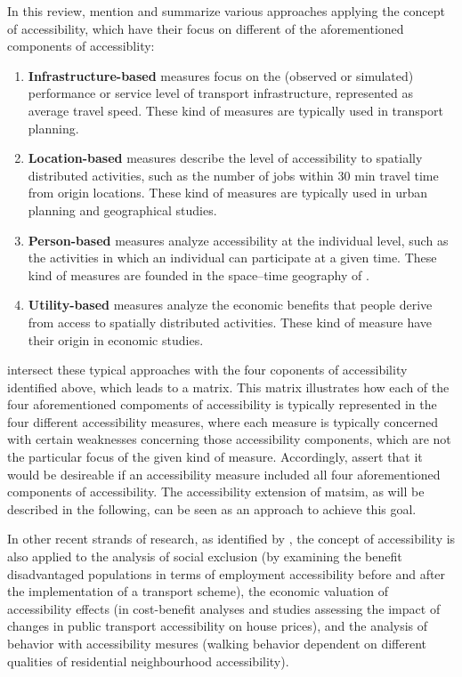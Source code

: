 In this review, \citet{Geurs2004AccessibilityReview} mention and summarize various approaches applying the concept 
of accessibility, which have their focus on different of the aforementioned components of accessiblity:

\begin{enumerate}
	\item \textbf{Infrastructure-based} measures focus on the (observed or simulated) performance or service level 
	of transport infrastructure, \eg represented as average travel speed. These kind of measures are typically used 
	in transport planning.
	
	\item \textbf{Location-based} measures describe the level of accessibility to spatially distributed activities, such as 
	the number of jobs within 30 min travel time from origin locations. These kind of measures are typically used 
	in urban planning and geographical studies.
	
	\item \textbf{Person-based} measures analyze accessibility at the individual level, such as the activities in which an 
	individual can participate at a given time. These kind of measures are founded in the space–time geography 
	of \citet{Haegerstrand1970}.
	
	\item \textbf{Utility-based} measures analyze the economic benefits that people derive from access to spatially 
	distributed activities. These kind of measure have their origin in economic studies.
\end{enumerate}

\citet{Geurs2004AccessibilityReview} intersect these typical approaches with the four coponents of accessibility identified 
above, which leads to a matrix. This matrix illustrates how each of the four aforementioned compoments of accessibility is 
typically represented in the four different accessibility measures, where each measure is typically concerned with certain weaknesses 
concerning those accessibility components, which are not the particular focus of the given kind of measure. Accordingly, \citet{Geurs2004AccessibilityReview} assert that it would be desireable if an accessibility measure included 
all four aforementioned components of accessibility. The accessibility extension of \gls{matsim}, as will be described in 
the following, can be seen as an approach to achieve this goal.

In other recent strands of research, as identified by \citet{GeursEtAl2012AccessibilityTransportIntroduction}, the concept of accessibility is also applied to the analysis of social exclusion (\eg by examining the benefit 
disadvantaged populations in terms of employment accessibility before and after the implementation of a transport scheme), 
the economic valuation of accessibility effects (\eg in cost-benefit analyses and studies assessing the impact of changes in 
public transport accessibility on house prices), and the analysis of behavior with accessibility mesures (\eg walking behavior 
dependent on different qualities of residential neighbourhood accessibility). 

